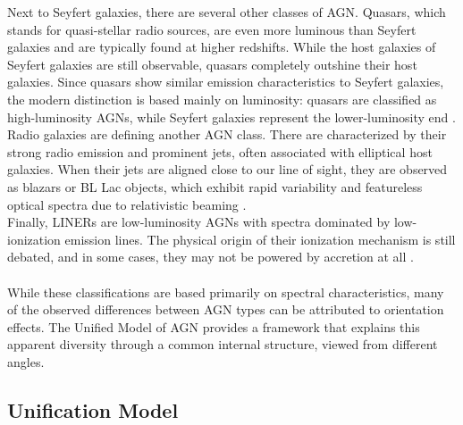 Next to Seyfert galaxies, there are several other classes of AGN. Quasars, which stands for quasi-stellar radio sources, are even more luminous than Seyfert galaxies and are typically found at higher redshifts. While the host galaxies of Seyfert galaxies are still observable, quasars completely outshine their host galaxies. Since quasars show similar emission characteristics to Seyfert galaxies, the modern distinction is based mainly on luminosity: quasars are classified as high-luminosity AGNs, while Seyfert galaxies represent the lower-luminosity end \parencite{netzer2013agn}.\\
Radio galaxies are defining another AGN class. There are characterized by their strong radio emission and prominent jets, often associated with elliptical host galaxies. When their jets are aligned close to our line of sight, they are observed as blazars or BL Lac objects, which exhibit rapid variability and featureless optical spectra due to relativistic beaming \parencite{netzer2013agn}.\\
Finally, LINERs are low-luminosity AGNs with spectra dominated by low-ionization emission lines. The physical origin of their ionization mechanism is still debated, and in some cases, they may not be powered by accretion at all \parencite{netzer2013agn}.\\\\
While these classifications are based primarily on spectral characteristics, many of the observed differences between AGN types can be attributed to orientation effects. The Unified Model of AGN provides a framework that explains this apparent diversity through a common internal structure, viewed from different angles.

\subsection{Unification Model}
\label{sec:unification_model}

